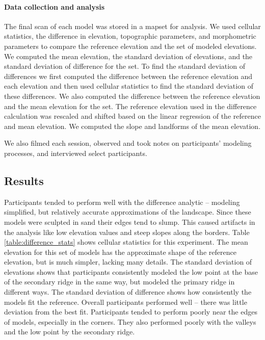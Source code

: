 \documentclass[prodmode,acmtochi]{acmsmall} %
\begin{document}
\paragraph{Data collection and analysis}
The final scan of each model was stored in a mapset for analysis. 
We used cellular statistics, the difference in elevation, 
topographic parameters, and morphometric parameters
to compare the reference elevation and the set of modeled elevations. 
We computed 
the mean elevation,
the standard deviation of elevations, 
and the standard deviation of difference for the set.
To find the standard deviation of differences 
we first computed the difference between the reference elevation and each elevation 
and then used cellular statistics to find the standard deviation of these differences.
We also computed the difference between the 
reference elevation and the mean elevation for the set. 
The reference elevation used in the difference calculation was rescaled and shifted based on the linear regression of the reference and mean elevation.
We computed the slope and landforms of the mean elevation. 

We also filmed each session, 
observed and took notes on participants' modeling processes, 
and interviewed select participants.
% 

\subsection{Results}
Participants tended to perform well with the difference analytic 
-- modeling simplified, but relatively accurate approximations of the landscape.
Since these models were sculpted in sand
their edges tend to slump.
This caused artifacts in the analysis like
low elevation values and steep slopes
along the borders. 
%
Table \ref{table:difference_stats} shows cellular statistics for this experiment.
%
The mean elevation for this set of models
has the approximate shape of the reference elevation, 
but is much simpler, lacking many details. 
The standard deviation of elevations shows that participants 
consistently modeled the low point at the base of the secondary ridge
in the same way, 
but modeled the primary ridge in different ways. 
The standard deviation of difference shows 
how consistently the models fit the reference. 
Overall participants performed well -- there was little deviation from the best fit. 
Participants tended to perform poorly near the edges of models, especially in the corners.
They also performed poorly with the valleys and the low point by the secondary ridge.
\end{document}
